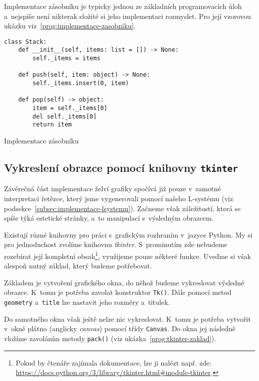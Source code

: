 Implementace zásobníku je typicky jednou ze základních programovacích úloh a~nejspíše není nikterak složité si jeho implementaci rozmyslet. Pro její vzorovou ukázku viz~\ref{prog:implementace-zasobniku}.
\begin{program}[h]
\begin{lstlisting}[style=python]
class Stack:
    def __init__(self, items: list = []) -> None:
        self._items = items

    def push(self, item: object) -> None:
        self._items.insert(0, item)
    
    def pop(self) -> object:
        item = self._items[0]
        del self._items[0]
        return item  
\end{lstlisting}
    \caption{Implementace zásobníku}
    \label{prog:implementace-zasobniku}
\end{program}

\subsection{Vykreslení obrazce pomocí knihovny \texttt{tkinter}}\label{subsec:vykresleni-obrazce}

Závěrečná část implementace želví grafiky spočívá již pouze v~samotné interpretaci řetězce, který jsme vygenerovali pomocí našeho L-systému (viz podsekce~\ref{subsec:implementace-lsystemu}). Začneme však záležitostí, která se spíše týká estetické stránky, a~to manipulací s~výsledným obrazcem.

Existují různé knihovny pro práci s~grafickým rozhraním v~jazyce Python. My si pro jednoduchost zvolíme knihovnu \emph{tkinter}. S~prominutím zde nebudeme rozebírat její kompletní obsah\footnote{Pokud by čtenáře zajímala dokumentace, lze ji nalézt např. zde: \url{https://docs.python.org/3/library/tkinter.html\#module-tkinter}.}, využijeme pouze některé funkce. Uveďme si však alespoň nutný základ, který budeme potřebovat.

Základem je vytvoření grafického okna, do něhož budeme vykreslovat výsledné obrazce. K~tomu je potřeba zavolat konstruktor \texttt{Tk()}. Dále pomocí metod \texttt{geometry} a~\texttt{title} lze nastavit jeho rozměry a~titulek.

Do samotného okna však ještě nelze nic vykreslovat. K~tomu je potřeba vytvořit v~okně plátno (anglicky \emph{canvas}) pomocí třídy \texttt{Canvas}. Do okna jej následně vložíme zavoláním metody \texttt{pack()} (viz ukázka~\ref{prog:tkinter-zaklad}).

